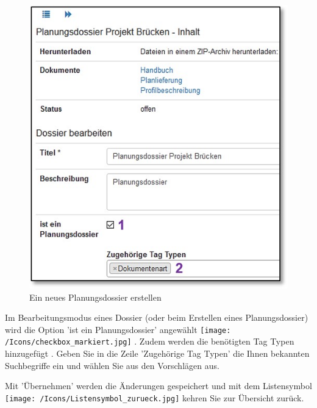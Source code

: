 \begin{figure}
  \vspace{-35pt}
  \begin{center}
    \includegraphics[width=1\linewidth]{../chapters/11_Dokumentenablage/pictures/plandos_Dossier.jpg}
  \end{center}
  \vspace{-20pt}
  \caption{Ein neues Planungsdossier erstellen}
  \vspace{-10pt}
\end{figure}

Im Bearbeitungsmodus eines Dossier (oder beim Erstellen eines Planungsdossier) wird die Option 'ist ein Planungsdossier' angewählt \texttt{[image: /Icons/checkbox\_markiert.jpg]} . Zudem werden die benötigten Tag Typen hinzugefügt . Geben Sie in die Zeile 'Zugehörige Tag Typen' die Ihnen bekannten Suchbegriffe ein und wählen Sie aus den Vorschlägen aus.

Mit 'Übernehmen' werden die Änderungen gespeichert und mit dem Listensymbol \texttt{[image: /Icons/Listensymbol\_zurueck.jpg]} kehren Sie zur Übersicht zurück.

\vspace{2cm}

